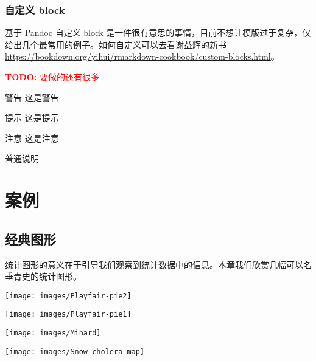 \documentclass[
  lang=cn,
  11pt,
  scheme=chinese,
  chinesefont=nofont,
  citestyle=gb7714-2015,
  bibstyle=gb7714-2015]{elegantbook}
\begin{document}
\hypertarget{custom-block}{%
\section{自定义 block}\label{custom-block}}

基于 Pandoc 自定义 block 是一件很有意思的事情，目前不想让模版过于复杂，仅给出几个最常用的例子。如何自定义可以去看谢益辉的新书 \url{https://bookdown.org/yihui/rmarkdown-cookbook/custom-blocks.html}。

\textcolor{red}{\textbf{TODO: }{要做的还有很多}}

\begin{rmdwarn}{警告}
这是警告

\end{rmdwarn}

\begin{rmdtip}{提示}
这是提示

\end{rmdtip}

\begin{rmdnote}{注意}
这是注意

\end{rmdnote}

普通说明

\hypertarget{part-ux6848ux4f8b}{%
\part{案例}\label{part-ux6848ux4f8b}}

\hypertarget{classic-fig}{%
\chapter{经典图形}\label{classic-fig}}

统计图形的意义在于引导我们观察到统计数据中的信息。本章我们欣赏几幅可以名垂青史的统计图形。

\begin{center}\texttt{[image: images/Playfair-pie2]} \end{center}

\begin{center}\texttt{[image: images/Playfair-pie1]} \end{center}

\begin{center}\texttt{[image: images/Minard]} \end{center}

\begin{center}\texttt{[image: images/Snow-cholera-map]} \end{center}
\end{document}

